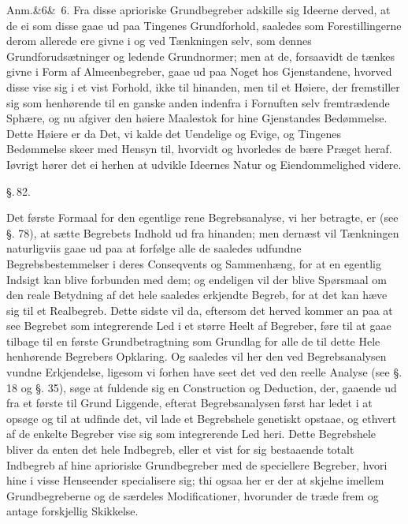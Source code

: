 \documentclass[12pt]{book}
\def\sperr#1{#1}%
\def\textit#1{#1}%
\newcommand{\sperr}[1]{\textls[180]{#1}}
\newcommand{\parag}[1]{%
  \par\vspace{0.9\baselineskip}%
  {\centering\textit{\S.\,#1.}\par}%
  \vspace{0.35\baselineskip}%
  \noindent\hspace{\parindent}\ignorespaces
}
\newcommand{\anm}[1]{%
  \par\vspace{0.5\baselineskip}%
  \noindent\hspace{\parindent}\sperr{Anm.}\ifx&#1&\else~\textit{#1}.\fi
  \enspace\ignorespaces
}
\newcommand{\opage}[1]{\marginnote{\footnotesize\textit{[#1]}}}
\begin{document}
\anm{6} Fra disse aprioriske Grundbegreber adskille sig Ideerne derved, at de ei
som disse gaae ud paa Tingenes Grundforhold, saaledes
\opage{220} som Forestillingerne derom allerede ere givne i og ved Tænkningen selv, som
dennes Grundforudsætninger og ledende Grundnormer; men at de, forsaavidt de
tænkes givne i Form af Almeenbegreber, gaae ud paa Noget hos Gjenstandene,
hvorved disse vise sig i et vist Forhold, ikke til hinanden, men til et Høiere,
der fremstiller sig som henhørende til en ganske anden indenfra i Fornuften selv
fremtrædende Sphære, og nu afgiver den høiere Maalestok for hine Gjenstandes
Bedømmelse. Dette Høiere er da Det, vi kalde det Uendelige og Evige, og Tingenes
Bedømmelse skeer med Hensyn til, hvorvidt og hvorledes de bære Præget heraf.
Iøvrigt hører det ei herhen at udvikle Ideernes Natur og Eiendommelighed videre.

\parag{82}
Det første Formaal for den egentlige rene Begrebsanalyse, vi her betragte, er
(see §. 78), at sætte Begrebets Indhold ud fra hinanden; men dernæst vil
Tænkningen naturligviis gaae ud paa at forfølge alle de saaledes udfundne
Begrebsbestemmelser i deres Conseqvents og Sammenhæng, for at en egentlig Indsigt
kan blive forbunden med dem; og endeligen vil der blive Spørsmaal om den reale
Betydning af det hele saaledes erkjendte Begreb, for at det kan hæve sig til et
Realbegreb. Dette sidste vil da, eftersom det herved kommer an paa at see
Begrebet som integrerende Led i et større Heelt af Begreber, føre til at gaae
tilbage til en første
\opage{221} Grundbetragtning som Grundlag for alle de til dette Hele henhørende Begrebers
Opklaring. Og saaledes vil her den ved Begrebsanalysen vundne Erkjendelse,
ligesom vi forhen have seet det ved den reelle Analyse (see §. 18 og §. 35), søge
at fuldende sig en Construction og Deduction, der, gaaende ud fra et første til
Grund Liggende, efterat Begrebsanalysen først har ledet i at opsøge og til at
udfinde det, vil lade et Begrebshele genetiskt opstaae, og ethvert af de enkelte
Begreber vise sig som integrerende Led heri. Dette Begrebshele bliver da enten
det hele Indbegreb, eller et vist for sig bestaaende totalt Indbegreb af hine
aprioriske Grundbegreber med de speciellere Begreber, hvori hine i visse
Henseender specialisere sig; thi ogsaa her er der at skjelne imellem
Grundbegreberne og de særdeles Modificationer, hvorunder de træde frem og antage
forskjellig Skikkelse.
\end{document}
